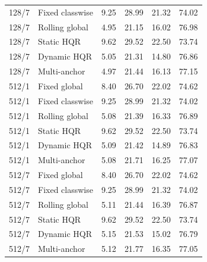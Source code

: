\begin{longtable}{llrrrr}
128/7 & Fixed classwise & 9.25 & 28.99 & 21.32 & 74.02\\
128/7 & Rolling global & 4.95 & 21.15 & 16.02 & 76.98\\
128/7 & Static HQR & 9.62 & 29.52 & 22.50 & 73.74\\
128/7 & Dynamic HQR & 5.05 & 21.31 & 14.80 & 76.86\\
128/7 & Multi-anchor & 4.97 & 21.44 & 16.13 & 77.15\\
512/1 & Fixed global & 8.40 & 26.70 & 22.02 & 74.62\\
512/1 & Fixed classwise & 9.25 & 28.99 & 21.32 & 74.02\\
512/1 & Rolling global & 5.08 & 21.39 & 16.33 & 76.89\\
512/1 & Static HQR & 9.62 & 29.52 & 22.50 & 73.74\\
512/1 & Dynamic HQR & 5.09 & 21.42 & 14.89 & 76.83\\
512/1 & Multi-anchor & 5.08 & 21.71 & 16.25 & 77.07\\
512/7 & Fixed global & 8.40 & 26.70 & 22.02 & 74.62\\
512/7 & Fixed classwise & 9.25 & 28.99 & 21.32 & 74.02\\
512/7 & Rolling global & 5.11 & 21.44 & 16.39 & 76.87\\
512/7 & Static HQR & 9.62 & 29.52 & 22.50 & 73.74\\
512/7 & Dynamic HQR & 5.15 & 21.53 & 15.02 & 76.79\\
512/7 & Multi-anchor & 5.12 & 21.77 & 16.35 & 77.05\\
\end{longtable}\endgroup
